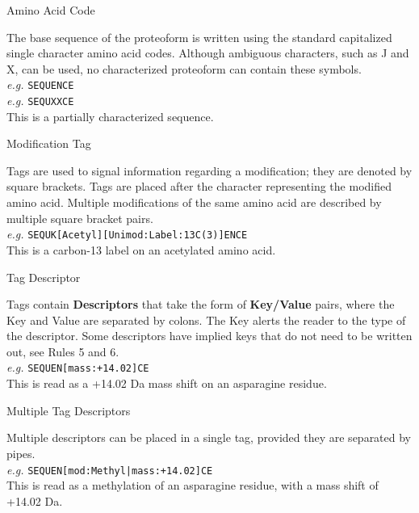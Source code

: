 
\begin{newrule}
Amino Acid Code
\end{newrule}

The base sequence of the proteoform is written using the standard capitalized single character amino acid codes. Although ambiguous characters, such as J and X, can be used, no characterized proteoform can contain these symbols.
\\

\indent \textit{e.g.} \texttt{SEQUENCE} \\
\indent \textit{e.g.} \texttt{SEQUXXCE} \\
\indent \indent This is a partially characterized sequence.
\\

\begin{newrule}
Modification Tag
\end{newrule}

Tags are used to signal information regarding a modification; they are denoted by square brackets. Tags are placed after the character representing the modified amino acid. Multiple modifications of the same amino acid are described by multiple square bracket pairs.
\\

\indent \textit{e.g.} \texttt{SEQUK[Acetyl][Unimod:Label:13C(3)]ENCE} \\
\indent \indent This is a carbon-13 label on an acetylated amino acid.
\\

\begin{newrule}
Tag Descriptor
\end{newrule}

Tags contain \textbf{Descriptors} that take the form of \textbf{Key/Value} pairs, where the Key and Value are separated by colons. The Key alerts the reader to the type of the descriptor. Some descriptors have implied keys that do not need to be written out, see Rules 5 and 6.
\\

\indent \textit{e.g.} \texttt{SEQUEN[mass:+14.02]CE} \\
\indent \indent This is read as a +14.02 Da mass shift on an asparagine residue.
\\

\begin{newrule}
Multiple Tag Descriptors
\end{newrule}

Multiple descriptors can be placed in a single tag, provided they are separated by pipes.
\\

\indent \textit{e.g.} \texttt{SEQUEN[mod:Methyl|mass:+14.02]CE} \\
\indent \indent This is read as a methylation of an asparagine residue, with a mass shift of +14.02 Da.
\\